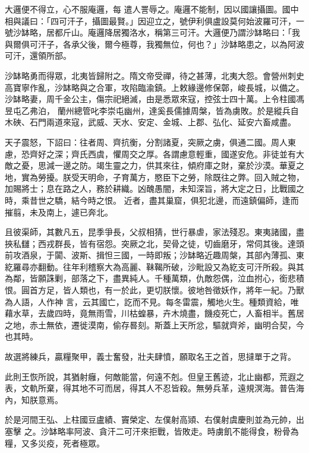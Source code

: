 \begin{pinyinscope}
 大邏便不得立，心不服庵邏，每
 遣人詈辱之。庵邏不能制，因以國讓攝圖。國中相與議曰：「四可汗子，攝圖最賢。」因迎立之，號伊利俱盧設莫何始波羅可汗，一號沙缽略，居都斤山。庵邏降居獨洛水，稱第三可汗。大邏便乃謂沙缽略曰：「我與爾俱可汗子，各承父後，爾今極尊，我獨無位，何也？」沙缽略患之，以為阿波可汗，還領所部。



 沙缽略勇而得眾，北夷皆歸附之。隋文帝受禪，待之甚薄，北夷大怨。會營州刺史高寶寧作亂，沙缽略與之合軍，攻陷臨渝鎮。上敕緣邊修保鄣，峻長城，以備之。沙缽略妻，周千金公主，傷宗祀絕滅，由是悉眾來寇，控弦士四十萬。上令柱國馮昱屯乙弗泊，
 蘭州總管叱李崇屯幽州，達奚長儒據周槃，皆為虜敗。於是縱兵自木硤、石門兩道來寇，武威、天水、安定、金城、上郡、弘化、延安六畜咸盡。



 天子震怒，下詔曰：往者周、齊抗衡，分割諸夏，突厥之虜，俱通二國。周人東慮，恐齊好之深；齊氏西虞，懼周交之厚。各謂慮意輕重，國遂安危。非徒並有大敵之憂，思減一邊之防。竭生靈之力，供其來往，傾府庫之財，棄於沙漠。華夏之地，實為勞擾。朕受天明命，子育萬方，愍臣下之勞，除既往之弊。回入賊之物，加賜將士；息在路之人，務於耕織。凶醜愚闇，未知深旨，將大定之日，比戰國之時，乘昔世之驕，結今時之恨。
 近者，盡其巢窟，俱犯北邊，而遠鎮偏師，逢而摧翦，未及南上，遽已奔北。



 且彼渠師，其數凡五，昆季爭長，父叔相猜，世行暴虐，家法殘忍。東夷諸國，盡挾私讎；西戎群長，皆有宿怨。突厥之北，契骨之徒，切齒磨牙，常伺其後。達頭前攻酒泉，于闐、波斯、揖怛三國，一時即叛；沙缽略近趣周槃，其部內薄孤、東紇羅尋亦翻動。往年利稽察大為高麗、靺鞨所破，沙毗設又為紇支可汗所殺。與其為鄰，皆願誅剿，部落之下，盡異純人。千種萬類，仇敵怨偶，泣血拊心，銜悲積恨。圓首方足，皆人類也，有一於此，更切朕懷。彼地咎徵妖作，將年一紀。乃獸為人語，人作神
 言，云其國亡，訖而不見。每冬雷震，觸地火生。種類資給，唯藉水草，去歲四時，竟無雨雪，川枯蝗暴，卉木燒盡，饑疫死亡，人畜相半。舊居之地，赤土無依，遷徙漠南，偷存晷刻。斯蓋上天所忿，驅就齊斧，幽明合契，今也其時。



 故選將練兵，贏糧聚甲，義士奮發，壯夫肆憤，願取名王之首，思撻單于之背。



 此則王恢所說，其猶射癰，何敵能當，何遠不剋。但皇王舊迹，北止幽都，荒遐之表，文軌所棄，得其地不可而居，得其人不忍皆殺。無勞兵革，遠規溟海。普告海內，知朕意焉。



 於是河間王弘、上柱國豆盧績、竇榮定、左僕射高熲、右僕射虞慶則並為元帥，出塞擊
 之。沙缽略率阿波、貪汗二可汗來拒戰，皆敗走。時虜飢不能得食，粉骨為糧，又多災疫，死者極眾。




\end{pinyinscope}
